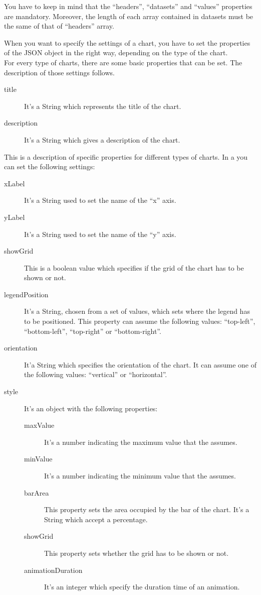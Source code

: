 				You have to keep in mind that the “headers”, “datasets” and “values” properties are mandatory. Moreover, the length of each array contained in datasets must be the same of that of “headers” array.

			When you want to specify the settings of a chart, you have to set the properties of the JSON object in the right way, depending on the type of the chart.\\
			For every type of charts, there are some basic properties that can be set. The description of those settings follows.
			\begin{description}
				\item[title] It's a String which represents the title of the chart.
				\item[description] It's a String which gives a description of the chart.
			\end{description}
			This is a description of specific properties for different types of charts.
				In a  you can set the following settings:
				\begin{description}
					\item[xLabel] It's a String used to set the name of the “x” axis.
					\item[yLabel] It's a String used to set the name of the “y” axis.
					\item[showGrid] This is a boolean value which specifies if the grid of the chart has to be shown or not.
					\item[legendPosition] It's a String, chosen from a set of values, which sets where the legend has to be positioned. This property can assume the following values: “top-left”, “bottom-left”, “top-right” or “bottom-right”.
					\item[orientation] It'a String which specifies the orientation of the chart. It can assume one of the following values: “vertical” or “horizontal”.
					\item[style] It's an object with the following properties:
					\begin{description}
						\item[maxValue] It's a number indicating the maximum value that the  assumes.
						\item[minValue] It's a number indicating the minimum value that the  assumes.
						\item[barArea] This property sets the area occupied by the bar of the chart. It's a String which accept a percentage.
						\item[showGrid] This property sets whether the grid has to be shown or not.
						\item[animationDuration] It's an integer which specify the duration time of an animation.
					\end{description}
				\end{description}
